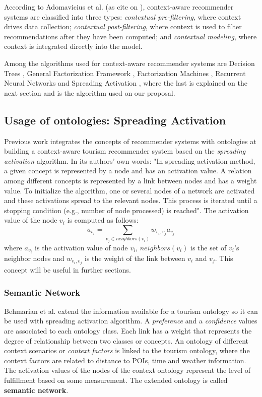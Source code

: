 According to Adomavicius et al. (as cite on \cite{pagano2016contextual}), context-aware recommender systems are classified into three types: \textit{contextual pre-filtering}, where context drives data collection; \textit{contextual post-filtering}, where context is used to filter recommendations after they have been computed; and \textit{contextual modeling}, where context is integrated directly into the model.

Among the algorithms used for context-aware recommender systems are Decision Trees \cite{pagano2016contextual}, General Factorization Framework \cite{hidasi2016general}, Factorization Machines \cite{rendle2011fast}, Recurrent Neural Networks \cite{pagano2016contextual} and Spreading Activation \cite{bahramian_abbaspour_claramunt_2017}, where the last is explained on the next section and is the algorithm used on our proposal.

\subsection{Usage of ontologies: Spreading Activation} \label{section:usage-spreading-activation}
Previous work \cite{bahramian_abbaspour_claramunt_2017} integrates the concepts of recommender systems with ontologies at building a context-aware tourism recommender system based on the \textit{spreading activation} algorithm. In its authors' own words: "In spreading activation method, a given concept is represented by a node and has an activation value. A relation among different concepts is represented by a link between nodes and has a weight value. To initialize the algorithm, one or several nodes of a network are activated and these activations spread to the relevant nodes. This process is iterated until a stopping condition (e.g., number of node processed) is reached". The activation value of the node \(v_i\) is computed as follows:
\begin{equation} \label{eq:og_activation}
a_{v_i} = \sum_{v_j \in neighbors(v_i)} w_{v_i, v_j} a_{v_j} 
\end{equation}
where $a_{v_i}$ is the activation value of node $v_i$, $neighbors(v_i)$ is the set of $v_i$'s neighbor nodes and $w_{v_i, v_j}$ is the weight of the link between $v_i$ and $v_j$. This concept will be useful in further sections. 

\subsubsection{Semantic Network}
Behmarian et al. \cite{bahramian_abbaspour_claramunt_2017} extend the information available for a tourism ontology so it can be used with spreading activation algorithm. A \textit{preference} and a \textit{confidence} values are associated to each ontology class. Each link has a weight that represents the degree of relationship between two classes or concepts. An ontology of different context scenarios or \textit{context factors} is linked to the tourism ontology, where the context factors are related to distance to POIs, time and weather information. The activation values of the nodes of the context ontology represent the level of fulfillment based on some measurement. The extended ontology is called \textbf{semantic network}.

